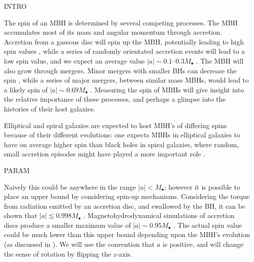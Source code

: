 INTRO

The spin of an MBH is determined by several competing processes. The MBH accumulates most of its mass and angular momentum through accretion. Accretion from a gaseous disc will spin up the MBH, potentially leading to high spin values \citep{Volonteri2005}, while a series of randomly orientated accretion events will lead to a low spin value, and we expect an average value $|a| \sim 0.1$--$0.3 M_\bullet$ \citep{King2006, King2008}. The MBH will also grow through mergers. Minor mergers with smaller BHs can decrease the spin \citep{Hughes2003, Gammie2004}, while a series of major mergers, between similar mass MBHs, would lead to a likely spin of $|a| \sim 0.69 M_\bullet$ \citep{Berti2008, Berti2007, Gonzalez2007}. Measuring the spin of MBHs will give insight into the relative importance of these processes, and perhaps a glimpse into the histories of their host galaxies.

Elliptical and spiral galaxies are expected to host MBH's of differing spins because of their different evolutions: one expects MBHs in elliptical galaxies to have on average higher spin than black holes in spiral galaxies, where random, small accretion episodes might have played a more important role \citep{Volonteri2007, Sikora2007}.





PARAM

Naively this could be anywhere in the range $|a| < M_\bullet$; however it is possible to place an upper bound by considering spin-up mechanisms. Considering the torque from radiation emitted by an accretion disc, and swallowed by the BH, it can be shown that $|a| \lesssim 0.998 M_\bullet$ \citep{Thorne1974}. Magnetohydrodynamical simulations of accretion discs produce a smaller maximum value of $|a| \sim 0.95 M_\bullet$ \citep{Gammie2004}. The actual spin value could be much lower than this upper bound depending upon the MBH's evolution (as discussed in ). We will use the convention that $a$ is positive, and will change the sense of rotation by flipping the $z$-axis.


  


